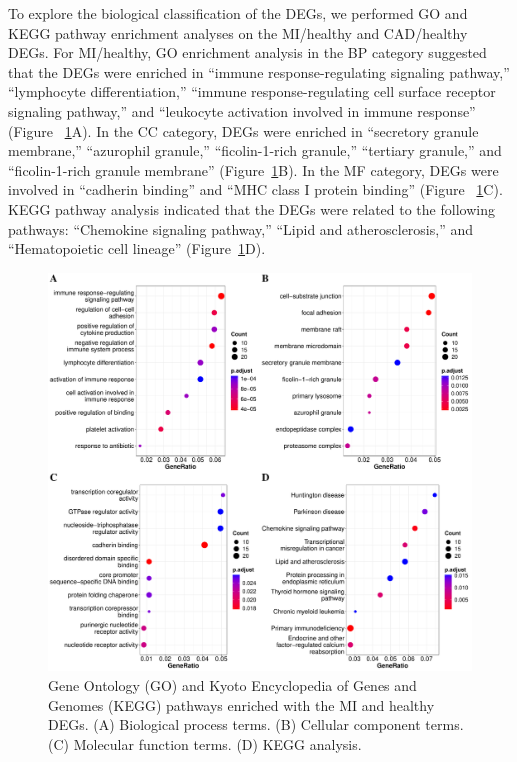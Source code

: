 \documentclass[sn-mathphys,Numbered]{sn-jnl}%
\theoremstyle{thmstyleone}%
\theoremstyle{thmstyletwo}%
\theoremstyle{thmstylethree}%
\begin{document}
To explore the biological classification of the DEGs, we performed GO
and KEGG pathway enrichment analyses on the MI/healthy and CAD/healthy
DEGs. For MI/healthy, GO enrichment analysis in the BP category
suggested that the DEGs were enriched in ``immune response-regulating
signaling pathway,'' ``lymphocyte differentiation,'' ``immune
response-regulating cell surface receptor signaling pathway,'' and
``leukocyte activation involved in immune response'' (Figure
~\ref{fig:MIHEnrich}A). In the CC category, DEGs were enriched in
``secretory granule membrane,'' ``azurophil granule,'' ``ficolin-1-rich
granule,'' ``tertiary granule,'' and ``ficolin-1-rich granule membrane''
(Figure~\ref{fig:MIHEnrich}B). In the MF category, DEGs were involved in
``cadherin binding'' and ``MHC class I protein binding'' (Figure
~\ref{fig:MIHEnrich}C). KEGG pathway analysis indicated that the DEGs
were related to the following pathways: ``Chemokine signaling pathway,''
``Lipid and atherosclerosis,'' and ``Hematopoietic cell lineage''
(Figure~\ref{fig:MIHEnrich}D).

\begin{figure}
\centering
\includegraphics[width=0.95\linewidth]{Enrichment MI-Healthy} \caption{Gene Ontology (GO) and Kyoto Encyclopedia of Genes and Genomes (KEGG) pathways enriched with the MI and healthy DEGs. (A) Biological process terms. (B) Cellular component terms. (C) Molecular function terms. (D) KEGG analysis.}
\label{fig:MIHEnrich}
\end{figure}
\end{document}
